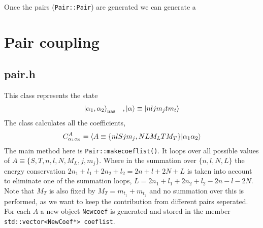 \documentclass[10pt]{article}
\begin{document}
Once the pairs (\texttt{Pair::Pair}) are generated we can generate a 



\section{Pair coupling}
\subsection{pair.h}
This class represents the state
\begin{align}
	\ket{ \alpha_1, \alpha_2}_{\textrm{nas}} \;\;\;, \ket{\alpha} \equiv \ket{n l j m_j t m_t}
\end{align}
The class calculates all the coefficients,
\begin{align}
	C_{\alpha_1 \alpha_2}^{A} = \braket{A \equiv \{ n l S j m_j, N L M_L T M_T\} | \alpha_1 \alpha_2}
	\label{eq:coef}
\end{align}
The main method here is \texttt{Pair::makecoeflist()}. It loops over all possible values of $ A \equiv \{ S,T,n,l,N,M_L,j,m_j \}$. Where in the summation over $\{n,l,N,L\}$ the energy conservation $2n_1 + l_1 + 2n_2 + l_2 = 2n + l + 2N + L$ is taken into account to eliminate one of the summation loops, $L = 2n_1 + l_1 + 2n_2 + l_2 - 2n - l - 2N$. Note that $M_T$ is also fixed by $M_T = m_{t_1} + m_{t_2}$ and no summation over this is performed, as we want to keep the contribution from different pairs seperated.
For each $A$ a new object \texttt{Newcoef} is generated and stored in the member \texttt{std::vector<NewCoef*> coeflist}.
\end{document}
